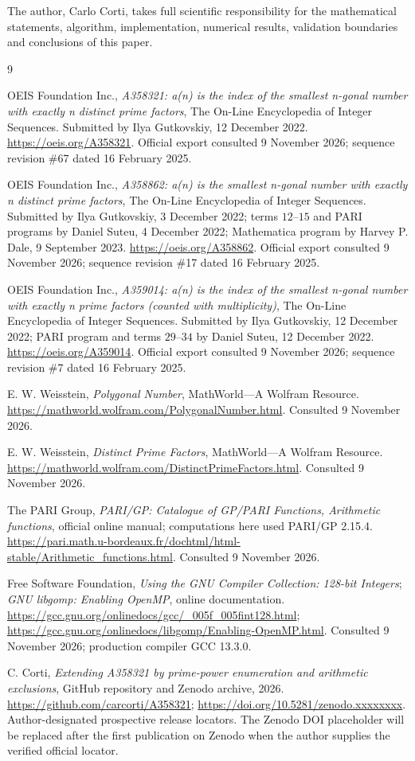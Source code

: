\documentclass[11pt]{article}
\theoremstyle{remark}
\begin{document}
The author, Carlo Corti, takes full scientific responsibility for the
mathematical statements, algorithm, implementation, numerical results,
validation boundaries and conclusions of this paper.

\clearpage
\begin{thebibliography}{9}
\sloppy\raggedright
{}
OEIS Foundation Inc., \emph{A358321: a(n) is the index of the smallest
n-gonal number with exactly n distinct prime factors},
The On-Line Encyclopedia of Integer Sequences.
Submitted by Ilya Gutkovskiy, 12 December 2022.
\url{https://oeis.org/A358321}.
Official export consulted 9 November 2026; sequence revision \#67 dated 16 February 2025.

OEIS Foundation Inc., \emph{A358862: a(n) is the smallest n-gonal number
with exactly n distinct prime factors},
The On-Line Encyclopedia of Integer Sequences.
Submitted by Ilya Gutkovskiy, 3 December 2022; terms $12$--$15$ and PARI
programs by Daniel Suteu, 4 December 2022; Mathematica program by
Harvey P. Dale, 9 September 2023.
\url{https://oeis.org/A358862}.
Official export consulted 9 November 2026; sequence revision \#17 dated 16 February 2025.

OEIS Foundation Inc., \emph{A359014: a(n) is the index of the smallest
n-gonal number with exactly n prime factors (counted with multiplicity)},
The On-Line Encyclopedia of Integer Sequences.
Submitted by Ilya Gutkovskiy, 12 December 2022; PARI program and terms
$29$--$34$ by Daniel Suteu, 12 December 2022.
\url{https://oeis.org/A359014}.
Official export consulted 9 November 2026; sequence revision \#7 dated 16 February 2025.

E. W. Weisstein, \emph{Polygonal Number}, MathWorld---A Wolfram Resource.
\url{https://mathworld.wolfram.com/PolygonalNumber.html}.
Consulted 9 November 2026.

E. W. Weisstein, \emph{Distinct Prime Factors}, MathWorld---A Wolfram Resource.
\url{https://mathworld.wolfram.com/DistinctPrimeFactors.html}.
Consulted 9 November 2026.

The PARI Group, \emph{PARI/GP: Catalogue of GP/PARI Functions,
Arithmetic functions}, official online manual; computations here used
PARI/GP 2.15.4.
\url{https://pari.math.u-bordeaux.fr/dochtml/html-stable/Arithmetic_functions.html}.
Consulted 9 November 2026.

Free Software Foundation, \emph{Using the GNU Compiler Collection:
128-bit Integers}; \emph{GNU libgomp: Enabling OpenMP}, online documentation.
\url{https://gcc.gnu.org/onlinedocs/gcc/_005f_005fint128.html};
\url{https://gcc.gnu.org/onlinedocs/libgomp/Enabling-OpenMP.html}.
Consulted 9 November 2026; production compiler GCC 13.3.0.

C. Corti, \emph{Extending A358321 by prime-power enumeration and arithmetic exclusions},
GitHub repository and Zenodo archive, 2026.
\url{https://github.com/carcorti/A358321};
\url{https://doi.org/10.5281/zenodo.xxxxxxxx}.
Author-designated prospective release locators. The Zenodo DOI placeholder
will be replaced after the first publication on Zenodo when the author
supplies the verified official locator.
\end{thebibliography}
\end{document}
